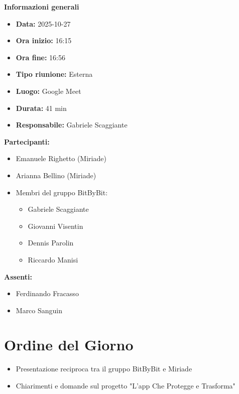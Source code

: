 \documentclass[a4paper,12pt]{article}
\begin{document}
\clearpage
{\large \textbf{Informazioni generali}}
{\footnotesize
{}

\begin{itemize}
    \item \textbf{Data:} 2025-10-27
    \item \textbf{Ora inizio:} 16:15
    \item \textbf{Ora fine:} 16:56
    \item \textbf{Tipo riunione:} Esterna
    \item \textbf{Luogo:} Google Meet
    \item \textbf{Durata:} 41 min
    \item \textbf{Responsabile:} Gabriele Scaggiante
\end{itemize}

\vspace{0.2cm}

\textbf{Partecipanti:}
\begin{itemize}
    \item Emanuele Righetto (Miriade)
    \item Arianna Bellino (Miriade)
    \item Membri del gruppo BitByBit:
    \begin{itemize}
        \item Gabriele Scaggiante
        \item Giovanni Visentin
        \item Dennis Parolin 
        \item Riccardo Manisi
    \end{itemize}
\end{itemize}

\textbf{Assenti:}
\begin{itemize}
    \item Ferdinando Fracasso
    \item Marco Sanguin
\end{itemize}
}

\vspace{0.5cm}

\vspace{0.8cm}

\clearpage
\tableofcontents
\thispagestyle{empty} %
\clearpage

\section{Ordine del Giorno}
\begin{itemize}
    \item Presentazione reciproca tra il gruppo BitByBit e Miriade
    \item Chiarimenti e domande sul progetto "L'app Che Protegge e Trasforma"
\end{itemize}
\end{document}

